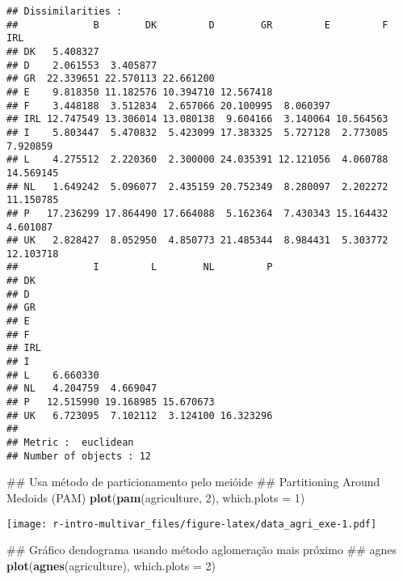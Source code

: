 \documentclass[]{book}
\newenvironment{Shaded}{\begin{snugshade}}{\end{snugshade}}
\newcommand{\KeywordTok}[1]{\textcolor[rgb]{0.13,0.29,0.53}{\textbf{{#1}}}}
\newcommand{\DataTypeTok}[1]{\textcolor[rgb]{0.13,0.29,0.53}{{#1}}}
\newcommand{\DecValTok}[1]{\textcolor[rgb]{0.00,0.00,0.81}{{#1}}}
\newcommand{\NormalTok}[1]{{#1}}
\begin{document}
\begin{verbatim}
## Dissimilarities :
##             B        DK         D        GR         E         F       IRL
## DK   5.408327                                                            
## D    2.061553  3.405877                                                  
## GR  22.339651 22.570113 22.661200                                        
## E    9.818350 11.182576 10.394710 12.567418                              
## F    3.448188  3.512834  2.657066 20.100995  8.060397                    
## IRL 12.747549 13.306014 13.080138  9.604166  3.140064 10.564563          
## I    5.803447  5.470832  5.423099 17.383325  5.727128  2.773085  7.920859
## L    4.275512  2.220360  2.300000 24.035391 12.121056  4.060788 14.569145
## NL   1.649242  5.096077  2.435159 20.752349  8.280097  2.202272 11.150785
## P   17.236299 17.864490 17.664088  5.162364  7.430343 15.164432  4.601087
## UK   2.828427  8.052950  4.850773 21.485344  8.984431  5.303772 12.103718
##             I         L        NL         P
## DK                                         
## D                                          
## GR                                         
## E                                          
## F                                          
## IRL                                        
## I                                          
## L    6.660330                              
## NL   4.204759  4.669047                    
## P   12.515990 19.168985 15.670673          
## UK   6.723095  7.102112  3.124100 16.323296
## 
## Metric :  euclidean 
## Number of objects : 12
\end{verbatim}

\begin{Shaded}
\begin{Highlighting}[]
\NormalTok{## Usa método de particionamento pelo meióide }
\NormalTok{## Partitioning Around Medoids (PAM)}
\KeywordTok{plot}\NormalTok{(}\KeywordTok{pam}\NormalTok{(agriculture, }\DecValTok{2}\NormalTok{), }\DataTypeTok{which.plots =} \DecValTok{1}\NormalTok{)}
\end{Highlighting}
\end{Shaded}

\texttt{[image: r-intro-multivar\_files/figure-latex/data\_agri\_exe-1.pdf]}

\begin{Shaded}
\begin{Highlighting}[]
\NormalTok{## Gráfico dendograma usando método aglomeração mais próximo}
\NormalTok{## agnes}
\KeywordTok{plot}\NormalTok{(}\KeywordTok{agnes}\NormalTok{(agriculture), }\DataTypeTok{which.plots =} \DecValTok{2}\NormalTok{)}
\end{Highlighting}
\end{Shaded}
\end{document}

